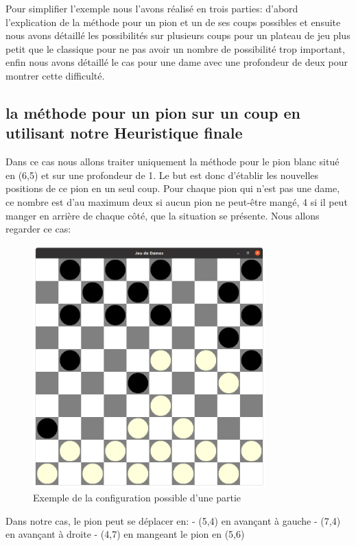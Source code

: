 \documentclass[12,french]{report}
\begin{document}
Pour simplifier l'exemple nous l'avons réalisé en trois parties:  d'abord l'explication de la méthode pour un pion et un de ses coups possibles et ensuite nous avons détaillé les possibilités sur plusieurs coups pour un plateau de jeu plus petit que le classique pour ne pas avoir un nombre de possibilité trop important, enfin nous avons détaillé le cas pour une dame avec une profondeur de deux pour montrer cette difficulté. 


\subsection{la méthode pour un pion sur un coup en utilisant notre Heuristique finale}
Dans ce cas nous allons traiter uniquement la méthode pour le pion blanc situé en (6,5) et sur une profondeur de 1. Le but est donc d'établir les nouvelles positions de ce pion en un seul coup. Pour chaque pion qui n'est pas une dame, ce nombre est d'au maximum deux si aucun pion ne peut-être mangé, 4 si il peut manger en arrière de chaque côté, que la situation se présente. 
Nous allons regarder ce cas: 

\begin{figure}[H]
	\center
	\includegraphics[width=0.8\textwidth]{./Images/image1heuristique} 
	\caption{Exemple de la configuration possible d'une partie}
\end{figure}\vspace{0.2cm}

Dans notre cas, le pion peut se déplacer en:
- (5,4) en avançant à gauche
- (7,4) en avançant à droite
- (4,7) en mangeant le pion en (5,6)
\end{document}
